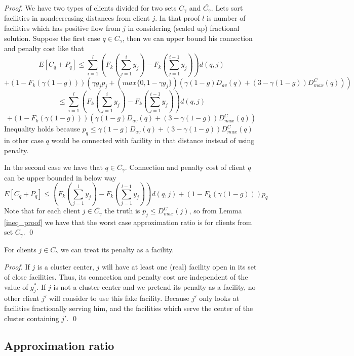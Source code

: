 \documentclass{llncs}
\begin{document}
\begin{proof}
 We have two types of clients divided for two sets $C_{\gamma}$ and $\bar{C_{\gamma}}$. Lets sort facilities in nondecreasing distances from client $j$. In that proof $l$ is number of facilities which has positive flow from $j$ in considering (scaled up) fractional solution. Suppose the first case $q \in C_{\gamma}$, then we can upper bound his connection and penalty cost like that 
 $$E[C_q + P_q] \leq \sum_{i = 1}^{l}(F_k(\sum_{j = 1}^{i} y_j) - F_k(\sum_{j = 1}^{i-1} y_j)) d(q,j) $$ $$ + (1 - F_k(\gamma (1 - g))) (\gamma g_j p_j + (max \{0, 1 - \gamma g_j\}) (\gamma (1 - g) D_{av}(q) + (3 - \gamma (1 - g)) D_{max}^C(q)))$$ $$\leq \sum_{i = 1}^{l}(F_k(\sum_{j = 1}^{i} y_j) - F_k(\sum_{j = 1}^{i-1} y_j)) d(q,j) $$ $$ + (1 - F_k(\gamma (1 - g))) (\gamma (1 - g) D_{av}(q) + (3 - \gamma (1 - g)) D_{max}^C(q)) $$ Inequality holds because $p_q \leq \gamma (1 - g) D_{av}(q) + (3 - \gamma (1 - g)) D_{max}^C(q)$ in other case $q$ would be connected with facility in that distance instead of using penalty.
 
 In the second case we have that $q \in \bar{C_{\gamma}}$. Connection and penalty cost of client $q$ can be upper bounded in below way
 $$E[C_q + P_q] \leq (F_k(\sum_{j = 1}^{l} y_j) - F_k(\sum_{j = 1}^{l-1} y_j)) d(q,j) + (1 - F_k(\gamma (1 - g))) p_q$$ Note that for each client $j \in \bar{C_{\gamma}}$ the truth is $p_j \leq D_{max}^C(j)$, so from Lemma \ref{ineq_proof} we have that the worst case approximation ratio is for clients from set $C_{\gamma}$.
 \qed
\end{proof}

\begin{lemma}
 \label{g_0}
 For clients $j \in C_{\gamma}$ we can treat its penalty as a facility.
\end{lemma}

\begin{proof}
If $j$ is a cluster center, $j$ will have at least one (real) facility open in {its} set of close facilities. Thus, its connection and penalty cost are independent of the value of $g_j^*$. If $j$ is not a cluster center and we pretend
its penalty as a facility, no other client $j'$ will consider to use this fake facility. Because $j'$ only looks at facilities
fractionally serving him, and the facilities which serve the center of the cluster containing $j'$.
\qed
\end{proof}

\subsection{Approximation ratio}
\label{group_analize}
\end{document}
